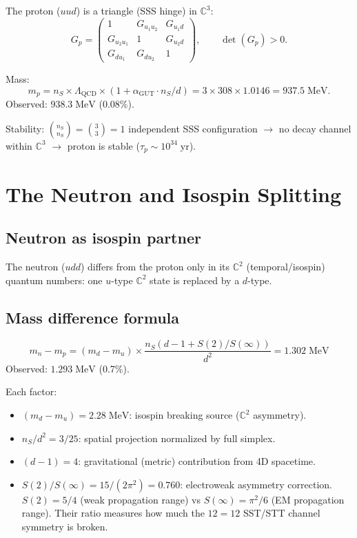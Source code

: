\documentclass[12pt]{article}
\theoremstyle{remark}
\begin{document}
The proton ($uud$) is a triangle (SSS hinge) in $\mathbb{C}^3$:
\begin{equation}
G_p = \begin{pmatrix} 1 & G_{u_1 u_2} & G_{u_1 d} \\ G_{u_2 u_1} & 1 & G_{u_2 d} \\ G_{d u_1} & G_{d u_2} & 1 \end{pmatrix}, \qquad \det(G_p) > 0.
\end{equation}

Mass:
\begin{equation}
m_p = n_S \times \Lambda_\text{QCD} \times (1 + \alpha_\text{GUT} \cdot n_S/d) = 3 \times 308 \times 1.0146 = 937.5\;\text{MeV}.
\end{equation}
Observed: $938.3\;\text{MeV}$ (0.08\%).

Stability: $\binom{n_S}{n_S} = \binom{3}{3} = 1$ independent SSS configuration $\to$ no decay channel within $\mathbb{C}^3$ $\to$ proton is stable ($\tau_p \sim 10^{34}\;\text{yr}$).

\section{The Neutron and Isospin Splitting}

\subsection{Neutron as isospin partner}

The neutron ($udd$) differs from the proton only in its $\mathbb{C}^2$ (temporal/isospin) quantum numbers: one $u$-type $\mathbb{C}^2$ state is replaced by a $d$-type.

\subsection{Mass difference formula}

\begin{equation}
\boxed{m_n - m_p = (m_d - m_u) \times \frac{n_S\!\left(d - 1 + S(2)/S(\infty)\right)}{d^2} = 1.302\;\text{MeV}}
\end{equation}
Observed: $1.293\;\text{MeV}$ (0.7\%).

Each factor:
\begin{itemize}
\item $(m_d - m_u) = 2.28\;\text{MeV}$: isospin breaking source ($\mathbb{C}^2$ asymmetry).
\item $n_S/d^2 = 3/25$: spatial projection normalized by full simplex.
\item $(d-1) = 4$: gravitational (metric) contribution from 4D spacetime.
\item $S(2)/S(\infty) = 15/(2\pi^2) = 0.760$: electroweak asymmetry correction. $S(2) = 5/4$ (weak propagation range) vs $S(\infty) = \pi^2/6$ (EM propagation range). Their ratio measures how much the $12 = 12$ SST/STT channel symmetry is broken.
\end{itemize}
\end{document}
